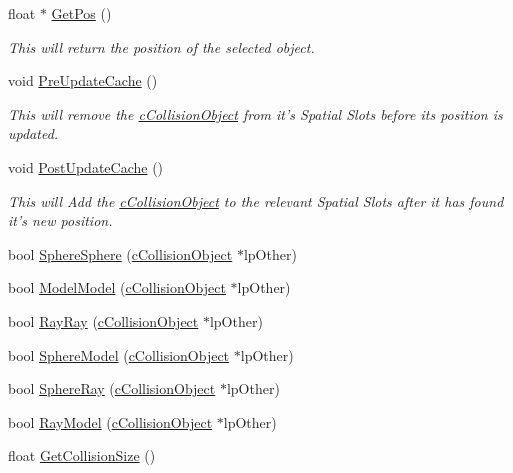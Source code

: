 \begin{DoxyCompactItemize}
float $\ast$ \hyperlink{classc_collision_object_a66f5ab6f3e5b3d618625b8c254f477ab}{GetPos} ()
\begin{DoxyCompactList}\small\item\em This will return the position of the selected object. \item\end{DoxyCompactList}\item 
void \hyperlink{classc_collision_object_a86932ba04099dd34874fd3ada314168c}{PreUpdateCache} ()
\begin{DoxyCompactList}\small\item\em This will remove the \hyperlink{classc_collision_object}{cCollisionObject} from it's Spatial Slots before its position is updated. \item\end{DoxyCompactList}\item 
void \hyperlink{classc_collision_object_a7719840f3fcc5bf3dcef08d123066739}{PostUpdateCache} ()
\begin{DoxyCompactList}\small\item\em This will Add the \hyperlink{classc_collision_object}{cCollisionObject} to the relevant Spatial Slots after it has found it's new position. \item\end{DoxyCompactList}\item 
bool \hyperlink{classc_collision_object_a53623f53b0ac497bfa1c794a76d2f818}{SphereSphere} (\hyperlink{classc_collision_object}{cCollisionObject} $\ast$lpOther)
\item 
bool \hyperlink{classc_collision_object_ae87264d7ecd143a67244c95b10c07ab7}{ModelModel} (\hyperlink{classc_collision_object}{cCollisionObject} $\ast$lpOther)
\item 
bool \hyperlink{classc_collision_object_aa4500b5834736e5abeabe71c300e64e8}{RayRay} (\hyperlink{classc_collision_object}{cCollisionObject} $\ast$lpOther)
\item 
bool \hyperlink{classc_collision_object_a299e49b5d78e1e7dbe5e801c7760462a}{SphereModel} (\hyperlink{classc_collision_object}{cCollisionObject} $\ast$lpOther)
\item 
bool \hyperlink{classc_collision_object_ae4761ec4a0f60667e83cb6d4cf39d359}{SphereRay} (\hyperlink{classc_collision_object}{cCollisionObject} $\ast$lpOther)
\item 
bool \hyperlink{classc_collision_object_a7ccea939e1f91fa7eeda4c31128901c3}{RayModel} (\hyperlink{classc_collision_object}{cCollisionObject} $\ast$lpOther)
\item 
float \hyperlink{classc_collision_object_ae6c320e7a3361fbbc4796463d777daab}{GetCollisionSize} ()
\end{DoxyCompactItemize}
